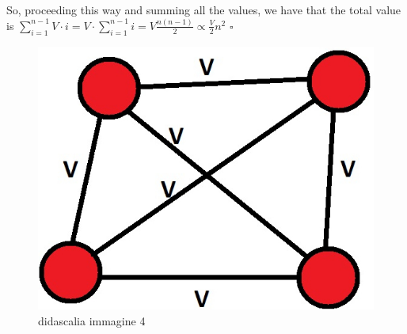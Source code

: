 \documentclass[12pt, a4page]{article}
\begin{document}
So, proceeding this way and summing all the values, we have that the total value is $\sum_{i=1}^{n-1} V \cdot i = V \cdot \sum_{i=1}^{n-1} i = V \frac{n(n-1)}{2} \propto \frac{V}{2} n^2$  \hfill $\square$
\newline \begin{figure}[htp]
\centering
\includegraphics[scale=1.00]{IMAGE4.jpg}
\caption{didascalia immagine 4}
\label{IMAGE4}
\end{figure} \newline
\end{document}
